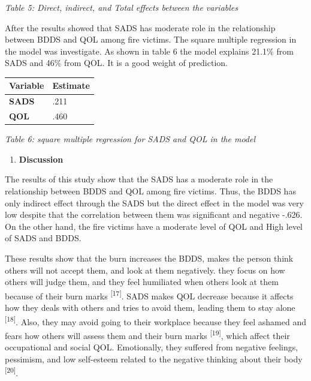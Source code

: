 \documentclass[
]{article}
\newcounter{none} %
\begin{document}
\emph{Table 5: Direct, indirect, and Total effects between the
variables}

After the results showed that SADS has moderate role in the relationship
between BDDS and QOL among fire victims. The square multiple regression
in the model was investigate. As shown in table 6 the model explains
21.1\% from SADS and 46\% from QOL. It is a good weight of prediction.

{\def\LTcaptype{none} %
\begin{longtable}[]{@{}
  >{\centering\arraybackslash}p{}
  >{\centering\arraybackslash}p{}@{}}
\toprule\noalign{}
\begin{minipage}[b]{\linewidth}\centering
\textbf{Variable}
\end{minipage} & \begin{minipage}[b]{\linewidth}\centering
\textbf{Estimate}
\end{minipage} \\
\midrule\noalign{}
\endhead
\bottomrule\noalign{}
\endlastfoot
\textbf{SADS} & .211 \\
\textbf{QOL} & .460 \\
\end{longtable}
}

\emph{Table 6: square multiple regression for SADS and QOL in the model}

\begin{enumerate}
\def\labelenumi{\arabic{enumi}.}
\setcounter{enumi}{3}
\item
  \textbf{Discussion}
\end{enumerate}

The results of this study show that the SADS has a moderate role in the
relationship between BDDS and QOL among fire victims. Thus, the BDDS has
only indirect effect through the SADS but the direct effect in the model
was very low despite that the correlation between them was significant
and negative -.626. On the other hand, the fire victims have a moderate
level of QOL and High level of SADS and BDDS.

These results show that the burn increases the BDDS, makes the person
think others will not accept them, and look at them negatively. they
focus on how others will judge them, and they feel humiliated when
others look at them because of their burn marks
\textsuperscript{{[}17{]}}. SADS makes QOL decrease because it affects
how they deals with others and tries to avoid them, leading them to stay
alone \textsuperscript{{[}18{]}}. Also, they may avoid going to their
workplace because they feel ashamed and fears how others will assess
them and their burn marks \textsuperscript{{[}19{]}}, which affect their
occupational and social QOL. Emotionally, they suffered from negative
feelings, pessimism, and low self-esteem related to the negative
thinking about their body \textsuperscript{{[}20{]}}.
\end{document}
